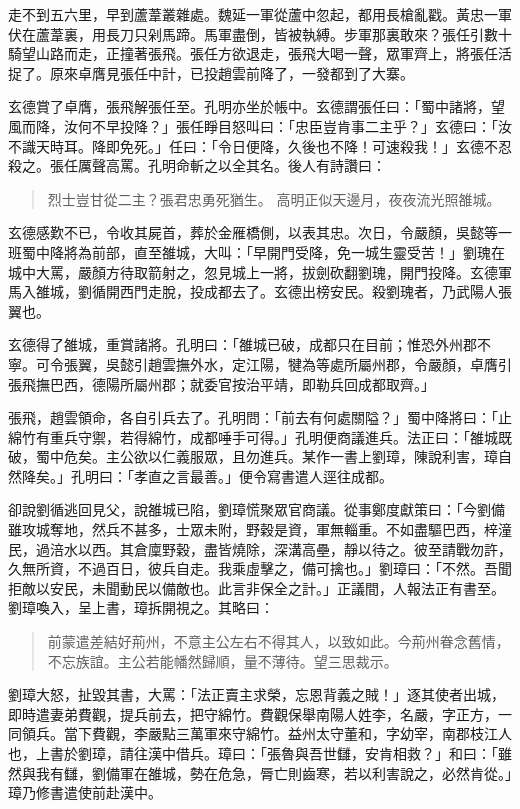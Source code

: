 走不到五六里，早到蘆葦叢雜處。魏延一軍從蘆中忽起，都用長槍亂戳。黃忠一軍伏在蘆葦裏，用長刀只剁馬蹄。馬軍盡倒，皆被執縛。步軍那裏敢來？張任引數十騎望山路而走，正撞著張飛。張任方欲退走，張飛大喝一聲，眾軍齊上，將張任活捉了。原來卓膺見張任中計，已投趙雲前降了，一發都到了大寨。

玄德賞了卓膺，張飛解張任至。孔明亦坐於帳中。玄德謂張任曰：「蜀中諸將，望風而降，汝何不早投降？」張任睜目怒叫曰：「忠臣豈肯事二主乎？」玄德曰：「汝不識天時耳。降即免死。」任曰：「令日便降，久後也不降！可速殺我！」玄德不忍殺之。張任厲聲高罵。孔明命斬之以全其名。後人有詩讚曰：

\begin{quote}
烈士豈甘從二主？張君忠勇死猶生。
高明正似天邊月，夜夜流光照雒城。
\end{quote}

玄德感歎不已，令收其屍首，葬於金雁橋側，以表其忠。次日，令嚴顏，吳懿等一班蜀中降將為前部，直至雒城，大叫：「早開門受降，免一城生靈受苦！」劉瑰在城中大罵，嚴顏方待取箭射之，忽見城上一將，拔劍砍翻劉瑰，開門投降。玄德軍馬入雒城，劉循開西門走脫，投成都去了。玄德出榜安民。殺劉瑰者，乃武陽人張翼也。

玄德得了雒城，重賞諸將。孔明曰：「雒城已破，成都只在目前；惟恐外州郡不寧。可令張翼，吳懿引趙雲撫外水，定江陽，犍為等處所屬州郡，令嚴顏，卓膺引張飛撫巴西，德陽所屬州郡；就委官按治平靖，即勒兵回成都取齊。」

張飛，趙雲領命，各自引兵去了。孔明問：「前去有何處關隘？」蜀中降將曰：「止綿竹有重兵守禦，若得綿竹，成都唾手可得。」孔明便商議進兵。法正曰：「雒城既破，蜀中危矣。主公欲以仁義服眾，且勿進兵。某作一書上劉璋，陳說利害，璋自然降矣。」孔明曰：「孝直之言最善。」便令寫書遣人逕往成都。

卻說劉循逃回見父，說雒城已陷，劉璋慌聚眾官商議。從事鄭度獻策曰：「今劉備雖攻城奪地，然兵不甚多，士眾未附，野穀是資，軍無輜重。不如盡驅巴西，梓潼民，過涪水以西。其倉廩野穀，盡皆燒除，深溝高壘，靜以待之。彼至請戰勿許，久無所資，不過百日，彼兵自走。我乘虛擊之，備可擒也。」劉璋曰：「不然。吾聞拒敵以安民，未聞動民以備敵也。此言非保全之計。」正議間，人報法正有書至。劉璋喚入，呈上書，璋拆開視之。其略曰：

\begin{quote}
前蒙遣差結好荊州，不意主公左右不得其人，以致如此。今荊州眷念舊情，不忘族誼。主公若能幡然歸順，量不薄待。望三思裁示。
\end{quote}

劉璋大怒，扯毀其書，大罵：「法正賣主求榮，忘恩背義之賊！」逐其使者出城，即時遣妻弟費觀，提兵前去，把守綿竹。費觀保舉南陽人姓李，名嚴，字正方，一同領兵。當下費觀，李嚴點三萬軍來守綿竹。益州太守董和，字幼宰，南郡枝江人也，上書於劉璋，請往漢中借兵。璋曰：「張魯與吾世讎，安肯相救？」和曰：「雖然與我有讎，劉備軍在雒城，勢在危急，脣亡則齒寒，若以利害說之，必然肯從。」璋乃修書遣使前赴漢中。

